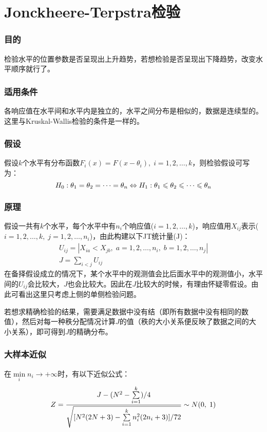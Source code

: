 \section{Jonckheere-Terpstra检验}

\subsubsection{目的}
检验水平的位置参数是否呈现出上升趋势，若想检验是否呈现出下降趋势，改变水平顺序就行了。
\subsubsection{适用条件}
各响应值在水平间和水平内是独立的，水平之间分布是相似的，数据是连续型的。这里与Kruskal-Wallis检验的条件是一样的。
\subsubsection{假设}
假设$k$个水平有分布函数$F_i(x)=F(x-\theta_i),\;i=1,2,\dots,k$，则检验假设可写为：
\begin{equation}
	H_0:\theta_1=\theta_2=\cdots=\theta_n\Leftrightarrow
	H_1:\theta_1\leqslant\theta_2\leqslant\cdots\leqslant\theta_n\notag
\end{equation}
\subsubsection{原理}
假设一共有$k$个水平，每个水平中有$n_i$个响应值($i=1,2,\dots,k$)，响应值用$X_{ij}$表示($i=1,2,\dots,k,\;j=1,2,\dots,n_i$)，由此构建以下JT统计量(J)：
\begin{gather*}
	U_{ij}=\left|X_{ia}<X_{jb},\;a=1,2,\dots,n_i,\;b=1,2,\dots,n_j\right| \\
	J=\sum_{i<j}U_{ij}
\end{gather*}
\hspace{2em}在备择假设成立的情况下，某个水平中的观测值会比后面水平中的观测值小，水平间的$U_{ij}$会比较大，$J$也会比较大。因此在$J$比较大的时候，有理由怀疑零假设。由此可看出这里只考虑上侧的单侧检验问题。\par
若想求精确检验的结果，需要满足数据中没有结（即所有数据中没有相同的数值），然后对每一种秩分配情况计算$J$的值（秩的大小关系便反映了数据之间的大小关系），即可得到$J$的精确分布。
\subsubsection{大样本近似}
在$\min\limits_in_i\to+\infty$时，有以下近似公式：
\begin{equation}
	Z=\frac{J-(N^2-\sum\limits_{i=1}^k)/4}{\sqrt{[N^2(2N+3)-\sum\limits_{i=1}^kn_i^2(2n_i+3)]/72}}\sim N(0,\;1)\notag
\end{equation}
